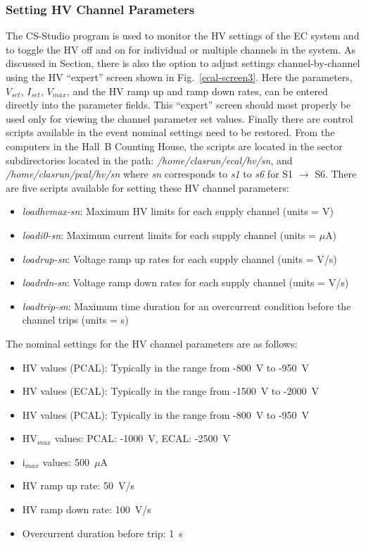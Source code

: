 \documentclass[letterpaper,10pt]{article}
\begin{document}
\subsubsection{Setting HV Channel Parameters}
\label{hv-parms}

The CS-Studio program is used to monitor the HV settings of the EC system and to toggle the HV off
and on for individual or multiple channels in the system.  As discussed in Section, there is also
the option to adjust settings channel-by-channel using the HV ``expert'' screen shown in
Fig.~\ref{ecal-screen3}. Here the parameters, $V_{set}$, $I_{set}$, $V_{max}$, and the HV ramp up and
ramp down rates, can be entered directly into the parameter fields.  This ``expert'' screen
should most properly be used only for viewing the channel parameter set values. Finally there are control scripts
available in the event nominal settings need to be restored. From the computers in the Hall~B Counting House,
the scripts are located in the sector subdirectories located in the path: {\it /home/clasrun/ecal/hv/sn}, and
{\it /home/clasrun/pcal/hv/sn} where {\it sn} corresponds to {\it s1} to {\it s6} for S1 $\to$ S6.
There are five scripts available for setting these HV channel parameters:

\begin{itemize}
\item {\it loadhvmax-sn}: Maximum HV limits for each supply channel (units = V)
\item {\it loadi0-sn}:    Maximum current limits for each supply channel (units = $\mu$A)
\item {\it loadrup-sn}:   Voltage ramp up rates for each supply channel (units = V/s)
\item {\it loadrdn-sn}:   Voltage ramp down rates for each supply channel (units = V/s)
\item {\it loadtrip-sn}:  Maximum time duration for an overcurrent condition before the 
channel trips (units = s)
\end{itemize}

The nominal settings for the HV channel parameters are as follows:

\begin{itemize}
\item HV values (PCAL): Typically in the range from -800~V to -950~V
\item HV values (ECAL): Typically in the range from -1500~V to -2000~V
\item HV values (PCAL): Typically in the range from -800~V to -950~V
\item HV$_{max}$ values: PCAL: -1000~V, ECAL: -2500~V
\item i$_{max}$ values: 500~$\mu$A
\item HV ramp up rate: 50~V/s
\item HV ramp down rate: 100~V/s
\item Overcurrent duration before trip: 1~s
\end{itemize}
\end{document}
